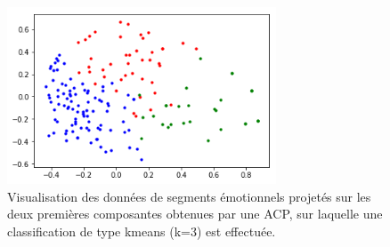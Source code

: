 \begin{figure}[h]
  \centering
  \includegraphics[width=8cm]{./Chapitre7/figures/datakmeans.png}
  \caption{Visualisation des données de segments émotionnels projetés sur les deux premières composantes obtenues par une ACP, sur laquelle une classification de type kmeans (k=3) est effectuée.}
  \label{fig:kmeans}
\end{figure}
